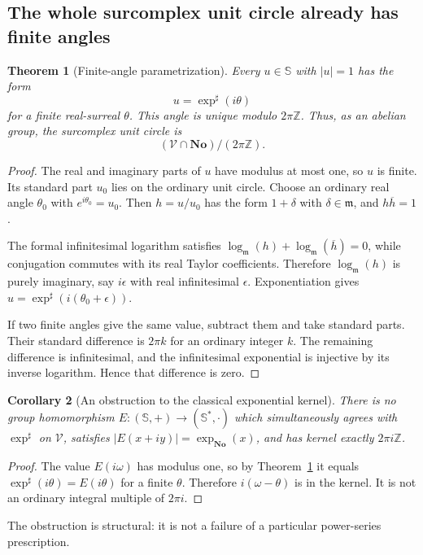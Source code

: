 \documentclass[11pt,a4paper]{article}
\newtheorem{theorem}{Theorem}[section]
\newtheorem{corollary}[theorem]{Corollary}
\theoremstyle{definition}
\theoremstyle{remark}
\newcommand{\No}{\mathbf{No}}
\newcommand{\SC}{\mathbb S}
\newcommand{\Z}{\mathbb Z}
\newcommand{\mm}{\mathfrak m}
\newcommand{\Fin}{\mathcal V}
\begin{document}
\subsection{The whole surcomplex unit circle already has finite angles}
\begin{theorem}[Finite-angle parametrization]\label{thm:angle}
Every $u\in\SC$ with $|u|=1$ has the form
\[
 u=\exp^\sharp(i\theta)
\]
for a finite real-surreal $\theta$. This angle is unique modulo
$2\pi\Z$. Thus, as an abelian group, the surcomplex unit circle is
\[
 (\Fin\cap\No)/(2\pi\Z).
\]
\end{theorem}
\begin{proof}
The real and imaginary parts of $u$ have modulus at most one, so $u$
is finite. Its standard part $u_0$ lies on the ordinary unit circle.
Choose an ordinary real angle $\theta_0$ with $e^{i\theta_0}=u_0$.
Then $h=u/u_0$ has the form $1+\delta$ with $\delta\in\mm$,
and $h\overline h=1$.

The formal infinitesimal logarithm satisfies
$\log_{\mm}(h)+\log_{\mm}(\overline h)=0$, while conjugation
commutes with its real Taylor coefficients. Therefore
$\log_{\mm}(h)$ is purely imaginary, say $i\epsilon$ with real
infinitesimal $\epsilon$. Exponentiation gives
$u=\exp^\sharp(i(\theta_0+\epsilon))$.

If two finite angles give the same value, subtract them and take
standard parts. Their standard difference is $2\pi k$ for an
ordinary integer $k$. The remaining difference is infinitesimal,
and the infinitesimal exponential is injective by its inverse
logarithm. Hence that difference is zero.
\end{proof}

\begin{corollary}[An obstruction to the classical exponential kernel]\label{cor:expobstruction}
There is no group homomorphism $E:(\SC,+)\to(\SC^*,\cdot)$
which simultaneously agrees with $\exp^\sharp$ on $\Fin$,
satisfies $|E(x+iy)|=\exp_{\No}(x)$, and has kernel exactly
$2\pi i\Z$.
\end{corollary}
\begin{proof}
The value $E(i\omega)$ has modulus one, so by
Theorem~\ref{thm:angle} it equals $\exp^\sharp(i\theta)=E(i\theta)$
for a finite $\theta$. Therefore $i(\omega-\theta)$ is in the
kernel. It is not an ordinary integral multiple of $2\pi i$.
\end{proof}
The obstruction is structural: it is not a failure of a particular
power-series prescription.
\end{document}
